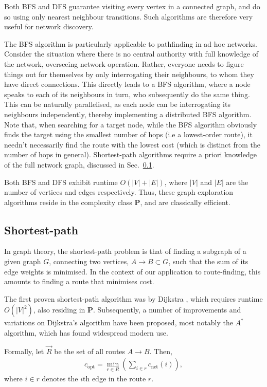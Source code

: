 \documentclass[aps,rmp,twocolumn,amsmath,amssymb,nofootinbib,superscriptaddress,longbibliography,floatfix]{revtex4-1}
\begin{document}
Both BFS and DFS guarantee visiting every vertex in a connected graph, and do so using only nearest neighbour transitions. Such algorithms are therefore very useful for network discovery.

The BFS algorithm is particularly applicable to pathfinding in ad hoc networks. Consider the situation where there is no central authority with full knowledge of the network, overseeing network operation. Rather, everyone needs to figure things out for themselves by only interrogating their neighbours, to whom they have direct connections. This directly leads to a BFS algorithm, where a node speaks to each of its neighbours in turn, who subsequently do the same thing. This can be naturally parallelised, as each node can be interrogating its neighbours independently, thereby implementing a distributed BFS algorithm. Note that, when searching for a target node, while the BFS algorithm obviously finds the target using the smallest number of hops (i.e a lowest-order route), it needn't necessarily find the route with the lowest cost (which is distinct from the number of hops in general). Shortest-path algorithms require a priori knowledge of the full network graph, discussed in Sec.~\ref{sec:shortest_path}.

Both BFS and DFS exhibit runtime \mbox{$O(|V|+|E|)$}, where $|V|$ and $|E|$ are the number of vertices and edges respectively. Thus, these graph exploration algorithms reside in the complexity class \textbf{P}, and are classically efficient.

%
%

\subsection{Shortest-path} \label{sec:shortest_path}

In graph theory, the shortest-path problem is that of finding a subgraph of a given graph $G$, connecting two vertices, \mbox{$A\to B \subset G$}, such that the sum of its edge weights is minimised. In the context of our application to route-finding, this amounts to finding a route that minimises cost.

The first proven shortest-path algorithm was by Dijkstra \cite{bib:Dijkstra59}, which requires runtime $O(|V|^2)$, also residing in \textbf{P}. Subsequently, a number of improvements and variations on Dijkstra's algorithm have been proposed, most notably the $A^*$ algorithm, which has found widespread modern use.

Formally, let $\vec{R}$ be the set of all routes \mbox{$A\to B$}. Then,
\begin{align}
c_\mathrm{opt} = \min_{r\in R} \left(\sum_{i\in r} c_\mathrm{net}(i) \right),
\end{align}
where \mbox{$i\in r$} denotes the $i$th edge in the route $r$.
\end{document}

